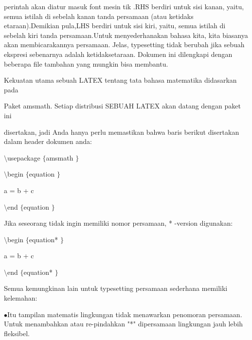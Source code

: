 \noindent 
perintah akan diatur masuk font mesin tik .RHS berdiri untuk sisi kanan, yaitu, semua istilah di sebelah kanan tanda persamaan (atau ketidaks etaraan).Demikian pula,LHS berdiri untuk sisi kiri, yaitu, semua istilah di sebelah kiri tanda persamaan.Untuk menyederhanakan bahasa kita, kita biasanya akan membicarakannya persamaan. Jelas, typesetting tidak berubah jika sebuah ekspresi sebenarnya adalah ketidaksetaraan. Dokumen ini dilengkapi dengan beberapa file tambahan yang mungkin bisa membantu. \par
\noindent 
 \hspace*{0.5in} Kekuatan utama sebuah LATEX tentang tata bahasa matematika didasarkan pada \par
\noindent 
Paket amsmath. Setiap distribusi SEBUAH LATEX akan datang dengan paket ini \par
\noindent 
disertakan, jadi Anda hanya perlu memastikan bahwa baris berikut disertakan dalam header dokumen anda: \par
\noindent 
\vspace{10pt}
\noindent 
 $  \setminus  $usepackage $  \{  $amsmath $  \}  $ \par
\noindent 
\vspace{12pt}
\noindent 
 $  \setminus  $begin $  \{  $equation $  \}  $ \par
\vspace{12pt}
\noindent 
a = b + c \par
\vspace{12pt}
\noindent 
 $  \setminus  $end $  \{  $equation $  \}  $ \par
\vspace{12pt}
\noindent 
Jika seseorang tidak ingin memiliki nomor persamaan, * -version digunakan: \par
\vspace{12pt}
\noindent 
 $  \setminus  $begin $  \{  $equation* $  \}  $ \par
\vspace{12pt}
\noindent 
a = b + c \par
\vspace{12pt}
\noindent 
 $  \setminus  $end $  \{  $equation* $  \}  $ \par
\vspace{12pt}
\noindent 
Semua kemungkinan lain untuk typesetting persamaan sederhana memiliki kelemahan: \par
\noindent 
  $ \bullet $Itu tampilan matematis lingkungan tidak menawarkan penomoran persamaan. Untuk menambahkan atau re-pindahkan "*" dipersamaan lingkungan jauh lebih fleksibel.
 \par
\noindent 

